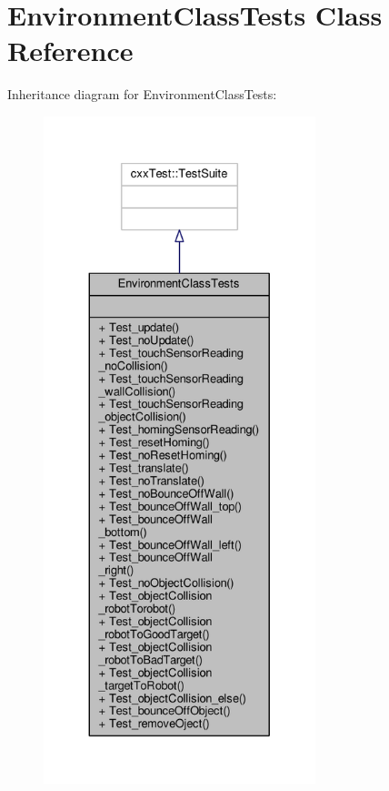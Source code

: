 \hypertarget{classEnvironmentClassTests}{\section{Environment\-Class\-Tests Class Reference}
\label{classEnvironmentClassTests}
}


Inheritance diagram for Environment\-Class\-Tests\-:\nopagebreak
\begin{figure}[H]
\begin{center}
\leavevmode
\includegraphics[height=550pt]{classEnvironmentClassTests__inherit__graph}
\end{center}
\end{figure}


